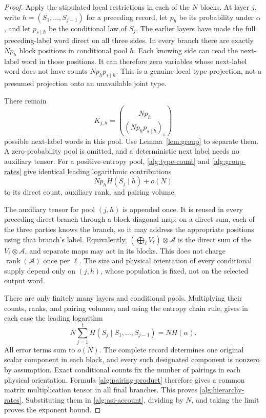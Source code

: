 \documentclass[11pt]{article}
\numberwithin{equation}{section}
\theoremstyle{definition}
\theoremstyle{remark}
\DeclareMathOperator{\rank}{rank}
\begin{document}
\begin{proof}
Apply the stipulated local restrictions in each of the \(N\) blocks.
At layer \(j\), write \(h=(S_1,\ldots,S_{j-1})\) for a preceding
record, let \(p_h\) be its probability under \(\alpha\), and let
\(p_{s\mid h}\) be the conditional law of \(S_j\).
The earlier layers have made the full preceding-label word direct on all
three sides.  In every branch there are exactly \(Np_h\) block positions
in conditional pool \(h\).  Each knowing side can read the next-label
word in those positions.  It can therefore zero variables whose next-label
word does not have counts \(Np_hp_{s\mid h}\).  This is a genuine local
type projection, not a presumed projection onto an unavailable joint type.

There remain
\[
 K_{j,h}=\binom{Np_h}{(Np_hp_{s\mid h})_s}
\]
possible next-label words in this pool.  Use Lemma~\ref{lem:group} to
separate them.  A zero-probability pool is omitted, and a deterministic
next label needs no auxiliary tensor.  For a positive-entropy pool,
\eqref{alg:type-count} and \eqref{alg:group-rates} give identical leading
logarithmic contributions
\[
 Np_h H(S_j\mid h)+o(N)
\]
to its direct count, auxiliary rank, and pairing volume.

The auxiliary tensor for pool \((j,h)\) is appended once.  It is reused
in every preceding direct branch through a block-diagonal map: on a direct
sum, each of the three parties knows the branch, so it may address the
appropriate positions using that branch's label.  Equivalently,
\((\bigoplus_\ell V_\ell)\otimes\mathcal A\) is the direct sum of the
\(V_\ell\otimes\mathcal A\), and separate maps may act in its blocks.
This does not charge \(\rank(\mathcal A)\) once per \(\ell\).
The size and physical orientation of every conditional supply depend only
on \((j,h)\), whose population is fixed, not on the selected output word.

There are only finitely many layers and conditional pools.  Multiplying
their counts, ranks, and pairing volumes, and using the entropy chain rule,
gives in each case the leading logarithm
\[
 N\sum_{j=1}^t H(S_j\mid S_1,\ldots,S_{j-1})=NH(\alpha).
\]
All error terms sum to \(o(N)\).  The complete record determines one
original scalar component in each block, and every such designated
component is nonzero by assumption.  Exact conditional counts fix the
number of pairings in each physical orientation.  Formula
\eqref{alg:pairing-product} therefore gives a common matrix multiplication
tensor in all final branches.  This proves \eqref{alg:hierarchy-rates}.
Substituting them in \eqref{alg:asi-account}, dividing by \(N\), and taking
the limit proves the exponent bound.
\end{proof}
\end{document}
